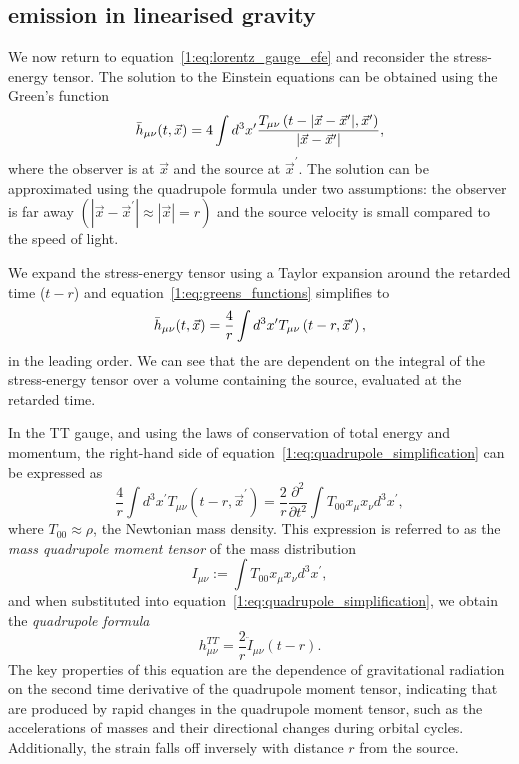 \subsection{\label{1:sec:gw-emission}\Gwadj emission in linearised gravity}

We now return to equation~\ref{1:eq:lorentz_gauge_efe} and reconsider the stress-energy tensor. The solution to the Einstein equations can be obtained using the Green's function
%
\begin{equation}
    \Bar{h}_{\mu\nu}(t, \vec{x}) = 4 \int d^3 x^{\prime} \frac{T_{\mu\nu}\left(t - |\vec{x} - \vec{x}^{\prime}|, \vec{x}^{\prime}\right)}{|\vec{x} - \vec{x}^{\prime}|},
    \label{1:eq:greens_functions}
\end{equation}
%
where the observer is at $\vec{x}$ and the source at $\vec{x}^{\prime}$. The solution can be approximated using the quadrupole formula under two assumptions: the observer is far away $\left(|\vec{x} - \vec{x}^{\prime}| \approx |\vec{x}| = r\right)$ and the source velocity is small compared to the speed of light. 

We expand the stress-energy tensor using a Taylor expansion around the retarded time ($t - r$) and equation~\ref{1:eq:greens_functions} simplifies to
%
\begin{equation}
    \Bar{h}_{\mu\nu}(t, \vec{x}) = \frac{4}{r} \int d^3 x^{\prime} T_{\mu\nu}\left(t - r, \vec{x}^{\prime}\right),
    \label{1:eq:quadrupole_simplification}
\end{equation}
%
in the leading order. We can see that the \gws are dependent on the integral of the stress-energy tensor over a volume containing the source, evaluated at the retarded time.

In the TT gauge, and using the laws of conservation of total energy and momentum, the right-hand side of equation~\ref{1:eq:quadrupole_simplification} can be expressed as
%
\begin{equation}
    \frac{4}{r} \int d^3 x^{\prime} T_{\mu\nu}\left(t - r, \vec{x}^{\prime}\right) = \frac{2}{r}\frac{\partial^{2}}{\partial t^{2}} \int T_{00} x_{\mu} x_{\nu} d^{3} x^{\prime},
\end{equation}
%
where $T_{00} \approx \rho$, the Newtonian mass density. This expression is referred to as the \textit{mass quadrupole moment tensor} of the mass distribution
%
\begin{equation}
    I_{\mu\nu} := \int T_{00} x_{\mu} x_{\nu} d^{3} x^{\prime},
    \label{1:eq:quadrupole_moment_tensor}
\end{equation}
%
and when substituted into equation~\ref{1:eq:quadrupole_simplification}, we obtain the \textit{quadrupole formula}
%
\begin{equation}
    h^{TT}_{\mu\nu} = \frac{2}{r} \ddot{I}_{\mu\nu}(t-r).
    \label{1:eq:quadrupole_formula}
\end{equation}
%
The key properties of this equation are the dependence of gravitational radiation on the second time derivative of the quadrupole moment tensor, indicating that \gws are produced by rapid changes in the quadrupole moment tensor, such as the accelerations of masses and their directional changes during orbital cycles. Additionally, the \gwadj strain falls off inversely with distance $r$ from the source.

